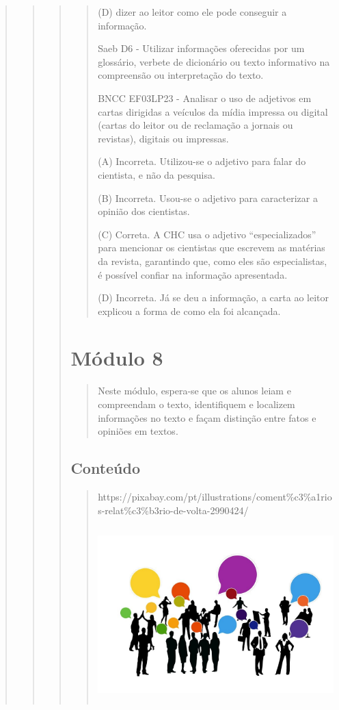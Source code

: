 \begin{quote}
\begin{quote}
\begin{quote}
\begin{quote}
(D) dizer ao leitor como ele pode conseguir a informação.

Saeb D6 - Utilizar informações oferecidas por um glossário, verbete de
dicionário ou texto informativo na compreensão ou interpretação do
texto.

BNCC EF03LP23 - Analisar o uso de adjetivos em cartas dirigidas a
veículos da mídia impressa ou digital (cartas do leitor ou de reclamação
a jornais ou revistas), digitais ou impressas.

(A) Incorreta. Utilizou-se o adjetivo para falar do cientista, e não da
pesquisa.

(B) Incorreta. Usou-se o adjetivo para caracterizar a opinião dos
cientistas.

(C) Correta. A CHC usa o adjetivo ``especializados'' para mencionar os
cientistas que escrevem as matérias da revista, garantindo que, como
eles são especialistas, é possível confiar na informação apresentada.

(D) Incorreta. Já se deu a informação, a carta ao leitor explicou a
forma de como ela foi alcançada.
\end{quote}

\section{Módulo 8}\label{muxf3dulo-8}

\begin{quote}
Neste módulo, espera-se que os alunos leiam e compreendam o texto,
identifiquem e localizem informações no texto e façam distinção entre
fatos e opiniões em textos.
\end{quote}

\subsection{Conteúdo}\label{conteuxfado-7}

\begin{quote}
https://pixabay.com/pt/illustrations/coment\%c3\%a1rios-relat\%c3\%b3rio-de-volta-2990424/

\includegraphics[width=3.98294in,height=2.65514in]{media/image24.jpeg}


\end{quote}
\end{quote}
\end{quote}
\end{quote}
